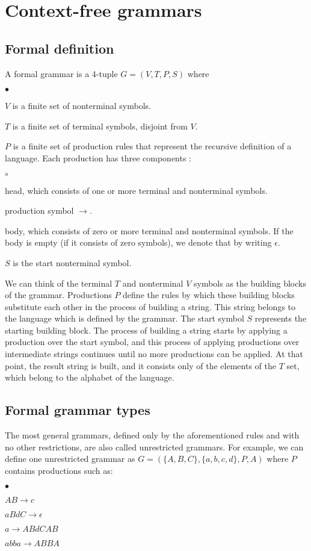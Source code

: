 \section{Context-free grammars}
\subsection{Formal definition}
A formal grammar is a 4-tuple $G = (V, T, P, S)$ \citep{sipser2013introduction} where
\begin{list}{$\bullet$}{}  	
	\item $V$ is a finite set of nonterminal symbols.
	\item $T$ is a finite set of terminal symbols, disjoint from $V$.
	\item $P$ is a finite set of production rules that represent the recursive definition of a language. Each production has three components \citep{hopcroft2007automatatheory}:
		\begin{list}{$\circ$}{}
			\item head, which consists of one or more terminal and nonterminal symbols.
			\item production symbol $\rightarrow$.
			\item body, which consists of zero or more terminal and nonterminal symbols. If the body is empty (if it consists of zero symbols), we denote that by writing $\epsilon$.
		\end{list}
	\item $S$ is the start nonterminal symbol.
\end{list}

We can think of the terminal $T$ and nonterminal $V$ symbols as the building blocks of the grammar. Productions $P$ define the rules by which these building blocks substitute each other in the process of building a string. This string belongs to the language which is defined by the grammar. The start symbol $S$ represents the starting building block. The process of building a string starts by applying a production over the start symbol, and this process of applying productions over intermediate strings continues until no more productions can be applied. At that point, the result string is built, and it consists only of the elements of the $T$ set, which belong to the alphabet of the language.

\subsection{Formal grammar types}
The most general grammars, defined only by the aforementioned rules and with no other restrictions, are also called unrestricted grammars. For example, we can define one unrestricted grammar as $G = (\{A, B, C\}, \{a, b, c, d\}, P, A)$ where $P$ contains productions such as:
\begin{list}{$\bullet$}{}  	
	\item $AB \rightarrow c$
	\item $aBdC \rightarrow \epsilon$
	\item $a \rightarrow ABdCAB$
	\item $abba \rightarrow ABBA$
\end{list}


